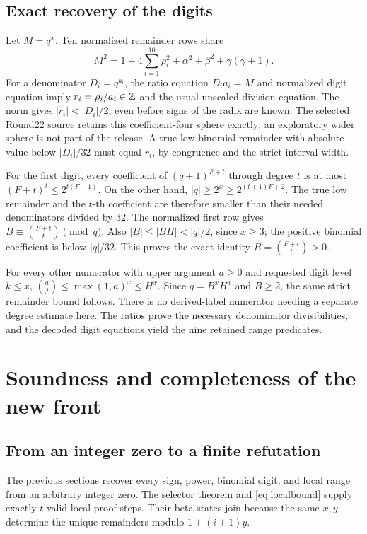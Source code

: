 \subsection{Exact recovery of the digits}

Let $M=q^x$. Ten normalized remainder rows share
\begin{equation}\label{eq:remaindernorm}
 M^2=1+4\sum_{i=1}^{10}\rho_i^2+\alpha^2+\beta^2+\gamma(\gamma+1).
\end{equation}
For a denominator $D_i=q^{k_i}$, the ratio equation
$D_i a_i=M$ and normalized digit equation imply
$r_i=\rho_i/a_i\in\mathbb Z$ and the usual unscaled division equation.
The norm gives $|r_i|<|D_i|/2$, even before signs of the radix
are known. The selected Round22 source retains this coefficient-four
sphere exactly; an exploratory wider sphere is not part of the release. A true low binomial remainder with absolute value below
$|D_i|/32$ must equal $r_i$, by congruence and the strict interval width.

For the first digit, every coefficient of $(q+1)^{F+t}$ through degree
$t$ is at most $(F+t)^t\le2^{t(F-1)}$. On the other hand,
$|q|\ge2^x\ge2^{(t+1)F+2}$. The true low remainder and the
$t$-th coefficient are therefore smaller than their needed denominators
divided by $32$. The normalized first row gives
$B\equiv \binom{F+t}{t}\pmod q$. Also
$|B|\le|BH|<|q|/2$, since $x\ge3$; the positive binomial coefficient
is below $|q|/32$. This proves the exact identity
$B=\binom{F+t}{t}>0$.

For every other numerator with upper argument $a\ge0$ and requested
digit level $k\le x$,
$\binom{a}{j}\le\max(1,a)^x\le H^x$. Since $q=B^xH^x$ and
$B\ge2$, the same strict remainder bound follows. There is no
derived-label numerator needing a separate degree estimate here.
The ratios prove the necessary denominator divisibilities, and the
decoded digit equations yield the nine retained range predicates.

\section{Soundness and completeness of the new front}

\subsection{From an integer zero to a finite refutation}

The previous sections recover every sign, power, binomial digit, and
local range from an arbitrary integer zero. The selector theorem and
\eqref{eq:localbound} supply exactly $t$ valid local proof steps.
Their beta states join because the same $x,y$ determine the unique
remainders modulo $1+(i+1)y$.


